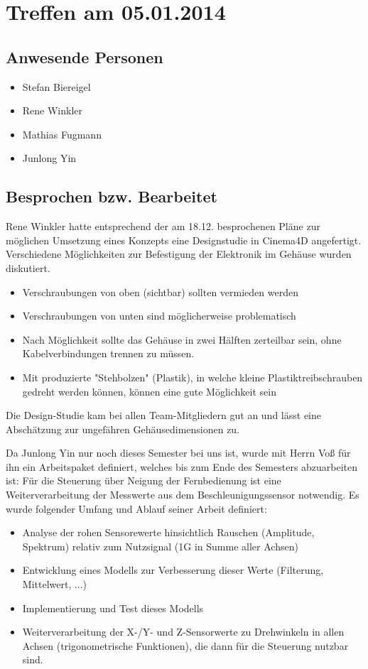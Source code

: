 \chapter{Treffen am 05.01.2014}
\section{Anwesende Personen}
\begin{itemize}
	\item Stefan Biereigel
	\item Rene Winkler
	\item Mathias Fugmann
	\item Junlong Yin
\end{itemize}

\section{Besprochen bzw. Bearbeitet}
Rene Winkler hatte entsprechend der am 18.12. besprochenen Pläne zur möglichen Umsetzung eines Konzepts eine Designstudie in Cinema4D angefertigt. Verschiedene Möglichkeiten zur Befestigung der Elektronik im Gehäuse wurden diskutiert.
\begin{itemize}
	\item Verschraubungen von oben (sichtbar) sollten vermieden werden
	\item Verschraubungen von unten sind möglicherweise problematisch
	\item Nach Möglichkeit sollte das Gehäuse in zwei Hälften zerteilbar sein, ohne Kabelverbindungen trennen zu müssen.
	\item Mit produzierte "Stehbolzen" (Plastik), in welche kleine Plastiktreibschrauben gedreht werden können, können eine gute Möglichkeit sein
\end{itemize}

Die Design-Studie kam bei allen Team-Mitgliedern gut an und lässt eine Abschätzung zur ungefähren Gehäusedimensionen zu.


Da Junlong Yin nur noch dieses Semester bei uns ist, wurde mit Herrn Voß für ihn ein Arbeitspaket definiert, welches bis zum Ende des Semesters abzuarbeiten ist: Für die Steuerung über Neigung der Fernbedienung ist eine Weiterverarbeitung der Messwerte aus dem Beschleunigungssensor notwendig. Es wurde folgender Umfang und Ablauf seiner Arbeit definiert:
\begin{itemize}
	\item Analyse der rohen Sensorewerte hinsichtlich Rauschen (Amplitude, Spektrum) relativ zum Nutzsignal (1G in Summe aller Achsen)
	\item Entwicklung eines Modells zur Verbesserung dieser Werte (Filterung, Mittelwert, ...)
	\item Implementierung und Test dieses Modells
	\item Weiterverarbeitung der X-/Y- und Z-Sensorwerte zu Drehwinkeln in allen Achsen (trigonometrische Funktionen), die dann für die Steuerung nutzbar sind.
\end{itemize}